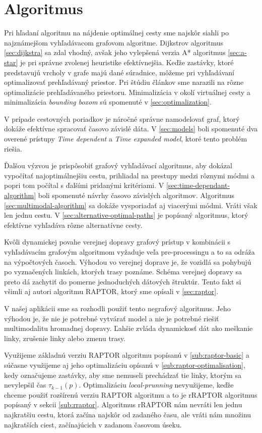 \section{Algoritmus}
Pri hľadaní algoritmu na nájdenie optimálnej cesty sme najskôr siahli po najznámejšom vyhľadávacom grafovom algoritme. Dijkstrov algoritmus \ref{sec:dijkstra} sa zdal vhodný, avšak jeho vylepšená verzia A* algoritmus \ref{sec:a-star} je pri správne zvolenej heuristike efektívnejšia. Keďže zastávky, ktoré predstavujú vrcholy v grafe majú dané súradnice, môžeme pri vyhľadávaní optimalizovať prehľadávaný priestor. Pri štúdiu článkov sme narazili na rôzne optimalizácie prehľadávaného priestoru. Minimalizácia v okolí virtuálnej cesty a minimalizácia \textit{bounding boxom} sú spomenuté v \ref{sec:optimalization}.

V prípade cestovných poriadkov je náročné správne namodelovať graf, ktorý dokáže efektívne spracovať časovo závislé dáta. V \ref{sec:models} boli spomenuté dva overené prístupy \textit{Time dependent} a \textit{Time expanded model}, ktoré tento problém riešia. 

Ďalšou výzvou je prispôsobiť grafový vyhľadávací algoritmus, aby dokázal vypočítať najoptimálnejšiu cestu, prihliadal na prestupy medzi rôznymi módmi a popri tom počítal s ďalšími pridanými kritériami.
V \ref{sec:time-dependant-algorithm} boli spomenuté návrhy časovo závislých algoritmov. Algoritmus \ref{sec:multimodal-algorithm} sa dokáže vysporiadať aj viacerými módmi. Vráti však len jednu cestu. V \ref{sec:alternative-optimal-paths} je popísaný algoritmus, ktorý efektívne vyhľadáva rôzne alternatívne cesty.

Kvôli dynamickej povahe verejnej dopravy grafový prístup v kombinácii s vyhľadávacím grafovým algoritmom vyžaduje veľa pre-processingu a to sa odráža na výpočtových časoch. Výhodou vo verejnej doprave je, že vozidlá sa pohybujú po vyznačených linkách, ktorých trasy poznáme. Schéma verejnej dopravy sa preto dá zachytiť do pomerne jednoduchých dátových štruktúr. Tento fakt si všimli aj autori algoritmu RAPTOR, ktorý sme opísali v \ref{sec:raptor}. 

V našej aplikácii sme sa rozhodli použiť tento negrafový algoritmus.
Jeho výhodou je, že nie je potrebné vytvárať model a nie je potrebné riešiť multimodalitu hromadnej dopravy. Ľahšie zvláda dynamickosť dát ako meškanie linky, zrušenie linky alebo zmenu trasy. 

Využijeme základnú verziu RAPTOR algoritmu popísanú v \ref{sub:raptor-basic} a súčasne využijeme aj jeho optimalizáciu opísanú v \ref{sub:raptor-optimalisation}, kedy označujeme zastávky, aby sme nemuseli prechádzať tie linky, ktorým sa nevylepšil čas $\tau_{k-1}(p)$. Optimalizáciu \textit{local-prunning} nevyužijeme, keďže chceme použiť rozšírenú verziu RAPTOR algoritmu a to je rRAPTOR algoritmus popísaný v sekcii \ref{sub:rraptor}. Algoritmus rRAPTOR nám nevráti len jednu najkratšiu cestu, ktorá začína najskôr od zadaného času, ale vráti nám množinu najkratších ciest, začínajúcich v zadanom časovom úseku.

